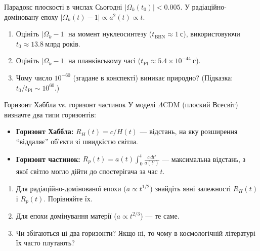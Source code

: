 \begin{problem}{Парадокс плоскості в числах}
Сьогодні \(|\Omega_k(t_0)| < 0.005\).
У радіаційно-доміновану епоху \(|\Omega_k(t)-1| \propto a^2(t) \propto t\).

\begin{enumerate}
    \item Оцініть \(|\Omega_k - 1|\) на момент нуклеосинтезу
          (\(t_{\text{BBN}} \approx 1\ \text{с}\)), використовуючи
          \(t_0 \approx 13.8\ \text{млрд років}\).
    \item Оцініть \(|\Omega_k - 1|\) на планківському часі
          (\(t_{\text{Pl}} \approx 5.4 \times 10^{-44}\ \text{с}\)).
    \item Чому число \(10^{-60}\) (згадане в конспекті) виникає природно?
          (Підказка: \(t_0 / t_{\text{Pl}} \sim 10^{60}\).)
\end{enumerate}
\end{problem}


\begin{problem}{Горизонт Хаббла vs. горизонт частинок}
У моделі \(\Lambda\)CDM (плоский Всесвіт) визначте два типи горизонтів:

\begin{itemize}
    \item \textbf{Горизонт Хаббла:} \(R_H(t) = c/H(t)\) --- відстань, на яку
          розширення ``віддаляє'' об'єкти зі швидкістю світла.
    \item \textbf{Горизонт частинок:} \(R_p(t) = a(t) \displaystyle\int_0^t \frac{c\,dt'}{a(t')}\)
          --- максимальна відстань, з якої світло могло дійти до спостерігача
          за час \(t\).
\end{itemize}

\begin{enumerate}
    \item Для радіаційно-домінованої епохи (\(a \propto t^{1/2}\))
          знайдіть явні залежності \(R_H(t)\) і \(R_p(t)\).
          Порівняйте їх.
    \item Для епохи домінування матерії (\(a \propto t^{2/3}\))
          --- те саме.
    \item Чи збігаються ці два горизонти? Якщо ні, то чому в космологічній
          літературі їх часто плутають?
\end{enumerate}
\end{problem}


